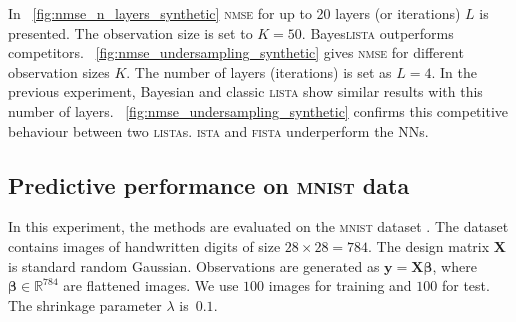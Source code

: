 \documentclass{article}
\begin{document}
  In \figurename~\ref{fig:nmse_n_layers_synthetic} \textsc{nmse} for up to 20 layers (or iterations) $L$ is presented. The observation size is set to $K=50$. Bayes\textsc{lista} outperforms competitors.
   \figurename~\ref{fig:nmse_undersampling_synthetic} gives \textsc{nmse} for different observation sizes $K$. The number of layers (iterations) is set as $L=4$. In the previous experiment, Bayesian and classic \textsc{lista} show similar results with this number of layers. \figurename~\ref{fig:nmse_undersampling_synthetic} confirms this competitive behaviour between two \textsc{lista}s. \textsc{ista} and \textsc{fista} underperform the NNs. %


  \subsection{Predictive performance on \textsc{mnist} data}
  In this experiment, the methods are evaluated on the \textsc{mnist} dataset \cite{lecun1998gradient}. The dataset contains images of handwritten digits of size $28 \times 28 = 784$. The design matrix $\mathbf{X}$ is standard random Gaussian. Observations are generated as $\mathbf{y} = \mathbf{X}\boldsymbol\beta$, where $\boldsymbol\beta \in \mathbb{R}^{784}$ are flattened images. We use $100$ images for training and $100$ for test. The shrinkage parameter $\lambda$ is~$0.1$.
\end{document}
